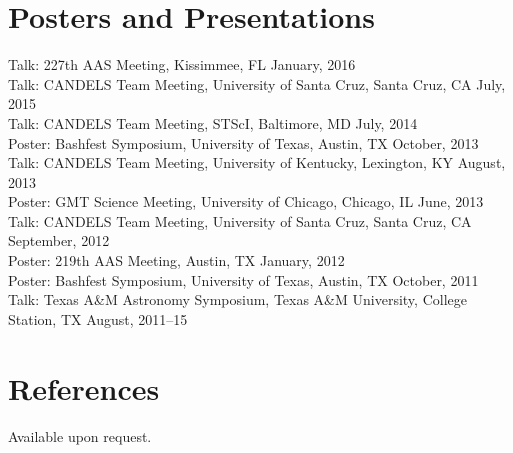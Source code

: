 \documentclass[margin,line, 11pt]{res}
\begin{document}
\begin{resume}
\section{\sc Posters and Presentations}
Talk: 227th AAS Meeting, Kissimmee, FL January, 2016\\
Talk: CANDELS Team Meeting, University of Santa Cruz, Santa Cruz, CA July, 2015\\
Talk: CANDELS Team Meeting, STScI, Baltimore, MD July, 2014\\
Poster: Bashfest Symposium, University of Texas, Austin, TX October, 2013\\
Talk: CANDELS Team Meeting, University of Kentucky, Lexington, KY August, 2013\\
Poster: GMT Science Meeting, University of Chicago, Chicago, IL June, 2013\\
Talk: CANDELS Team Meeting, University of Santa Cruz, Santa Cruz, CA September, 2012\\
Poster: 219th AAS Meeting, Austin, TX January, 2012\\ 
Poster: Bashfest Symposium, University of Texas, Austin, TX October, 2011\\
Talk: Texas A\&M Astronomy Symposium, Texas A\&M University, College Station, TX August, 2011--15\\

\section{\sc References}
Available upon request.

\end{resume}
\end{document}
